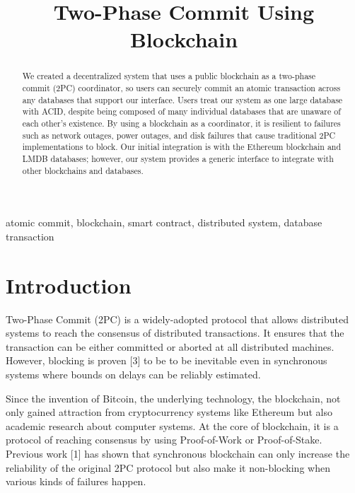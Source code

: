 \documentclass[11pt,conference]{IEEEtran}
\begin{document}
\title{Two-Phase Commit Using Blockchain}

\author{
\and
{}
\and
{}
}

\maketitle

\begin{abstract}
We created a decentralized system that uses a public blockchain as a two-phase commit (2PC) coordinator, so users can securely commit an atomic transaction across any databases that support our interface. Users treat our system as one large database with ACID, despite being composed of many individual databases that are unaware of each other’s existence. By using a blockchain as a coordinator, it is resilient to failures such as network outages, power outages, and disk failures that cause traditional 2PC implementations to block. Our initial integration is with the Ethereum blockchain and LMDB databases; however, our system provides a generic interface to integrate with other blockchains and databases.
\end{abstract}

\begin{IEEEkeywords}
atomic commit, blockchain, smart contract, distributed system, database transaction
\end{IEEEkeywords}

\section{Introduction}
Two-Phase Commit (2PC) is a widely-adopted protocol that allows distributed systems to reach the consensus of distributed transactions. It ensures that the transaction can be either committed or aborted at all distributed machines. However, blocking is proven [3] to be to be inevitable even in
synchronous systems where bounds on delays can be reliably estimated. 

Since the invention of Bitcoin, the underlying technology, the blockchain, not only gained attraction from  cryptocurrency systems like Ethereum but also academic research about computer systems. At the core of blockchain, it is a protocol of reaching consensus by using Proof-of-Work or Proof-of-Stake. Previous work [1] has shown that synchronous blockchain can only increase the reliability of the original 2PC protocol but also make it non-blocking when various kinds of failures happen.
\end{document}
